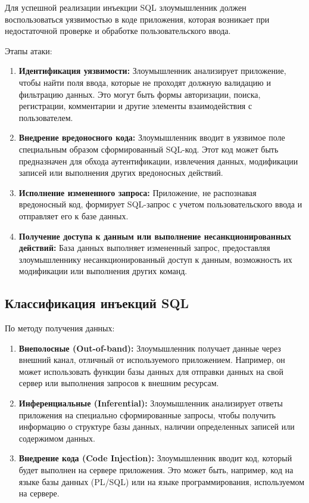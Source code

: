 \documentclass[a4paper,12pt]{diplom}
\begin{document}
	Для успешной реализации инъекции SQL злоумышленник должен воспользоваться уязвимостью в коде приложения, которая возникает при недостаточной проверке и обработке пользовательского ввода. 
	
	Этапы атаки:
	\begin{enumerate}[label=\arabic{enumi})]
		\item \textbf{Идентификация уязвимости: }
			Злоумышленник анализирует приложение, чтобы найти поля ввода, которые не проходят должную валидацию и фильтрацию данных.  Это могут быть формы авторизации, поиска, регистрации, комментарии и другие элементы взаимодействия с пользователем. 
		\item \textbf{Внедрение вредоносного кода: }
			Злоумышленник вводит в уязвимое поле специальным образом сформированный SQL-код. Этот код может быть предназначен для обхода аутентификации, извлечения данных, модификации записей или выполнения других вредоносных действий.
		\item \textbf{Исполнение измененного запроса: }
			Приложение, не распознавая вредоносный код, формирует SQL-запрос с учетом пользовательского ввода и отправляет его к базе данных. 
		\item \textbf{Получение доступа к данным или выполнение несанкционированных действий: }
			База данных выполняет измененный запрос, предоставляя злоумышленнику 	несанкционированный доступ к данным, возможность их модификации или выполнения других команд. 
	\end{enumerate}
	
	
	\subsection{Классификация инъекций SQL}
	
	По методу получения данных:
	\begin{enumerate}[label=\arabic{enumi})]
		\item \textbf{Внеполосные (Out-of-band): }
		Злоумышленник получает данные через внешний канал, отличный от используемого приложением.  Например, он может использовать функции базы данных для отправки данных на свой сервер или выполнения запросов к внешним ресурсам.
		\item \textbf{ Инференциальные (Inferential): }
		Злоумышленник анализирует ответы приложения на специально сформированные запросы, чтобы получить информацию о структуре базы данных, наличии определенных записей или содержимом данных.
		\item \textbf{Внедрение кода (Code Injection): }
		Злоумышленник вводит код, который будет выполнен на сервере приложения. Это может быть, например, код на языке базы данных (PL/SQL) или на языке программирования, используемом на сервере.
	\end{enumerate}
	
\end{document}
